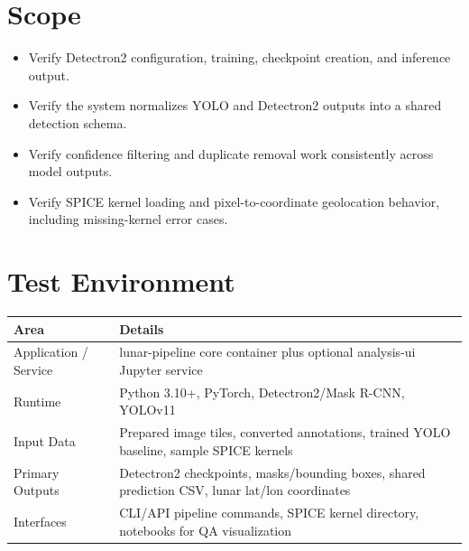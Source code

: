 \documentclass[11pt,landscape]{article}
\begin{document}
\section*{Scope}
\begin{itemize}[leftmargin=*]
\item Verify Detectron2 configuration, training, checkpoint creation, and inference output.
\item Verify the system normalizes YOLO and Detectron2 outputs into a shared detection schema.
\item Verify confidence filtering and duplicate removal work consistently across model outputs.
\item Verify SPICE kernel loading and pixel-to-coordinate geolocation behavior, including missing-kernel error cases.
\end{itemize}
\section*{Test Environment}
\begin{longtable}{p{2.0in}p{7.6in}}\toprule\textbf{Area} & \textbf{Details}\\\midrule\endhead
Application / Service & lunar-pipeline core container plus optional analysis-ui Jupyter service \\
Runtime & Python 3.10+, PyTorch, Detectron2/Mask R-CNN, YOLOv11 \\
Input Data & Prepared image tiles, converted annotations, trained YOLO baseline, sample SPICE kernels \\
Primary Outputs & Detectron2 checkpoints, masks/bounding boxes, shared prediction CSV, lunar lat/lon coordinates \\
Interfaces & CLI/API pipeline commands, SPICE kernel directory, notebooks for QA visualization \\
\bottomrule\end{longtable}
\end{document}
